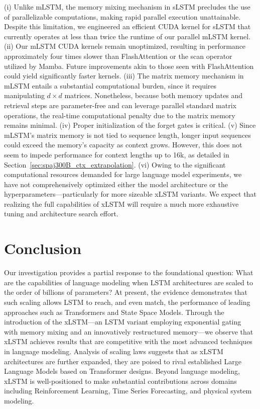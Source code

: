 (i) Unlike mLSTM, the memory mixing mechanism in sLSTM precludes the use of parallelizable computations, making rapid parallel execution unattainable. Despite this limitation, we engineered an efficient CUDA kernel for sLSTM that currently operates at less than twice the runtime of our parallel mLSTM kernel. (ii) Our mLSTM CUDA kernels remain unoptimized, resulting in performance approximately four times slower than FlashAttention or the scan operator utilized by Mamba. Future improvements akin to those seen with FlashAttention could yield significantly faster kernels. (iii) The matrix memory mechanism in mLSTM entails a substantial computational burden, since it requires manipulating $d \times d$ matrices. Nonetheless, because both memory updates and retrieval steps are parameter-free and can leverage parallel standard matrix operations, the real-time computational penalty due to the matrix memory remains minimal. (iv) Proper initialization of the forget gates is critical. (v) Since mLSTM's matrix memory is not tied to sequence length, longer input sequences could exceed the memory’s capacity as context grows. However, this does not seem to impede performance for context lengths up to 16k, as detailed in Section~\ref{sec:spaj300B_ctx_extrapolation}. (vi) Owing to the significant computational resources demanded for large language model experiments, we have not comprehensively optimized either the model architecture or the hyperparameters—particularly for more sizeable xLSTM variants. We expect that realizing the full capabilities of xLSTM will require a much more exhaustive tuning and architecture search effort.

\section{Conclusion}
Our investigation provides a partial response to the foundational question: What are the capabilities of language modeling when LSTM architectures are scaled to the order of billions of parameters? At present, the evidence demonstrates that such scaling allows LSTM to reach, and even match, the performance of leading approaches such as Transformers and State Space Models. Through the introduction of the xLSTM—an LSTM variant employing exponential gating with memory mixing and an innovatively restructured memory—we observe that xLSTM achieves results that are competitive with the most advanced techniques in language modeling. Analysis of scaling laws suggests that as xLSTM architectures are further expanded, they are poised to rival established Large Language Models based on Transformer designs. Beyond language modeling, xLSTM is well-positioned to make substantial contributions across domains including Reinforcement Learning, Time Series Forecasting, and physical system modeling.

